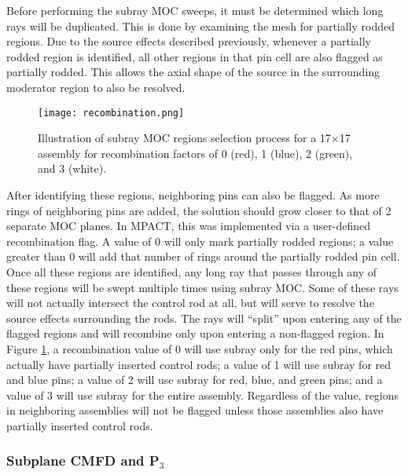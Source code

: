Before performing the subray MOC sweeps, it must be determined which long rays will be duplicated.  This is done by examining the mesh for partially rodded regions.  Due to the source effects described previously, whenever a partially rodded region is identified, all other regions in that pin cell are also flagged as partially rodded.  This allows the axial shape of the source in the surrounding moderator region to also be resolved.

\begin{figure}
    \centering
    \texttt{[image: recombination.png]}
    \caption{Illustration of subray MOC regions selection process for a 17$\times$17 assembly for recombination factors of 0 (red), 1 (blue), 2 (green), and 3 (white).}\label{f:recombination}
\end{figure}

After identifying these regions, neighboring pins can also be flagged.  As more rings of neighboring pins are added, the solution should grow closer to that of 2 separate MOC planes.  In MPACT, this was implemented via a user-defined recombination flag.  A value of 0 will only mark partially rodded regions; a value greater than 0 will add that number of rings around the partially rodded pin cell.  Once all these regions are identified, any long ray that passes through any of these regions will be swept multiple times using subray MOC.  Some of these rays will not actually intersect the control rod at all, but will serve to resolve the source effects surrounding the rods.  The rays will ``split'' upon entering any of the flagged regions and will recombine only upon entering a non-flagged region.  In Figure \ref{f:recombination}, a recombination value of 0 will use subray only for the red pins, which actually have partially inserted control rods; a value of 1 will use subray for red and blue pins; a value of 2 will use subray for red, blue, and green pins; and a value of 3 will use subray for the entire assembly.  Regardless of the value, regions in neighboring assemblies will not be flagged unless those assemblies also have partially inserted control rods.

\subsubsection{Subplane CMFD and \texorpdfstring{P$_3$}{P3}}

